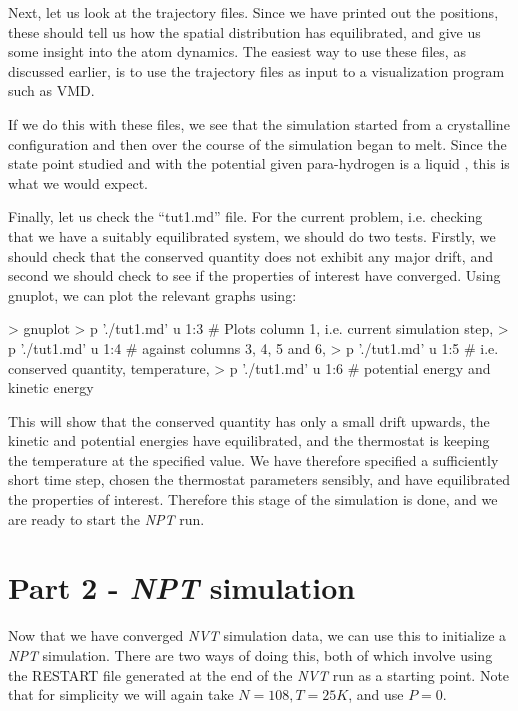 \documentclass[11pt,english,fleqn]{report}
\newenvironment{code}{%
\footnotesize 
\verbatim
}{
\endverbatim
\normalsize
}
\begin{document}
Next, let us look at the trajectory files. Since we have printed out
the positions, these should tell us how the spatial distribution
has equilibrated, and give us some insight into the atom dynamics.
The easiest way to use these files, as discussed earlier, is to
use the trajectory files as input to a visualization program such as VMD.

If we do this with these files, we see that the simulation started
from a crystalline configuration and then over the course
of the simulation began to melt. Since the state point studied
and with the potential given para-hydrogen is a liquid \cite{silv-gold78jcp},
this is what we would expect.

Finally, let us check the {}``tut1.md'' file. For the current
problem, i.e. checking that we have a suitably equilibrated system,
we should do two tests. Firstly,
we should check that the conserved quantity does not exhibit any major
drift, and second we should check to see if the properties of interest
have converged. Using gnuplot, we can plot the relevant graphs using:

\begin{code}
> gnuplot
> p './tut1.md' u 1:3 # Plots column 1, i.e. current simulation step, 
> p './tut1.md' u 1:4 # against columns 3, 4, 5 and 6,
> p './tut1.md' u 1:5 # i.e. conserved quantity, temperature,
> p './tut1.md' u 1:6 # potential energy and kinetic energy
\end{code}

This will show that the conserved quantity has only a small drift upwards,
the kinetic and potential energies have equilibrated, and the thermostat
is keeping the temperature at the specified value.
We have therefore specified a sufficiently short time step, chosen the
thermostat parameters sensibly, and have equilibrated the properties
of interest.
Therefore this stage of the simulation is done, and we are ready
to start the \emph{NPT} run.

\section{Part 2 - \emph{NPT} simulation}

\label{part2}

Now that we have converged \emph{NVT} simulation data, we can use this to
initialize a \emph{NPT} simulation. 
There are two ways of doing this,
both of which involve using the RESTART file generated at
the end of the \emph{NVT} run as a starting point.
Note that for simplicity we will again take \(N=108, T=25 K\), and use
\(P=0\).
\end{document}
